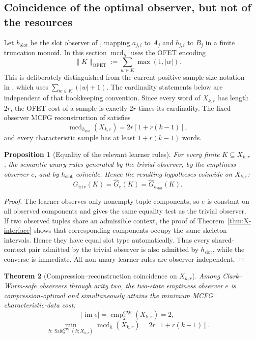\documentclass[11pt]{article}
\newtheorem{theorem}{Theorem}[section]
\newtheorem{proposition}[theorem]{Proposition}
\theoremstyle{definition}
\theoremstyle{remark}
\newcommand{\im}{\operatorname{im}}
\newcommand{\cmp}{\operatorname{cmp}}
\newcommand{\mcd}{\operatorname{mcd}}
\newcommand{\Safe}{\operatorname{Safe}}
\begin{document}
\subsection{Coincidence of the optimal observer, but not of the resources}

Let $h_{\mathrm{slot}}$ be the slot observer of \cite{KuriyamaOFET}, mapping
$a_{j,i}$ to $A_j$ and $b_{j,i}$ to $B_j$ in a finite truncation monoid.  In
this section $\mcd_h$ uses the OFET encoding
\[
 \|K\|_{\mathrm{OFET}}:=\sum_{w\in K}\max(1,|w|).
\]
This is deliberately distinguished from the current positive-sample-size
notation in \cite{KuriyamaMCFG}, which uses $\sum_{w\in K}(|w|+1)$.  The
cardinality statements below are independent of that bookkeeping convention.
Since every word of $X_{k,r}$ has length $2r$, the OFET cost of a sample is
exactly $2r$ times its cardinality.  The fixed-observer MCFG reconstruction of
\cite{KuriyamaOFET} satisfies
\[
 \boxed{
 \mcd_{h_{\mathrm{slot}}}(X_{k,r})
 =2r[1+r(k-1)],
 }
\]
and every characteristic sample has at least $1+r(k-1)$ words.

\begin{proposition}[Equality of the relevant learner rules]
\label{prop:X-learner-equality}
For every finite $K\subseteq X_{k,r}$, the semantic unary rules generated by
the trivial observer, by the emptiness observer $e$, and by
$h_{\mathrm{slot}}$ coincide.  Hence the resulting hypotheses coincide on
$X_{k,r}$:
\[
 \widehat G_{\mathrm{triv}}(K)
 =\widehat G_e(K)
 =\widehat G_{h_{\mathrm{slot}}}(K).
\]
\end{proposition}

\begin{proof}
The learner observes only nonempty tuple components, so $e$ is constant on all
observed components and gives the same equality test as the trivial observer.
If two observed tuples share an admissible context, the proof of
Theorem~\ref{thm:X-interface} shows that corresponding components occupy the
same skeleton intervals.  Hence they have equal slot type automatically.
Thus every shared-context pair admitted by the trivial observer is also
admitted by $h_{\mathrm{slot}}$, while the converse is immediate.  All
non-unary learner rules are observer independent.
\end{proof}

\begin{theorem}[Compression--reconstruction coincidence on $X_{k,r}$]
\label{thm:X-coincidence}
Among Clark--Wurm-safe observers through arity two, the two-state emptiness
observer $e$ is compression-optimal and simultaneously attains the minimum
MCFG characteristic-data cost:
\[
 |\im e|=\cmp_2^{\mathrm{CW}}(X_{k,r})=2,
\]
\[
 \boxed{
 \min_{h:\Safe_2^{\mathrm{CW}}(h;X_{k,r})}
 \mcd_h(X_{k,r})
 =2r[1+r(k-1)].
 }
\]
\end{theorem}
\end{document}
